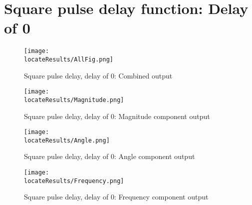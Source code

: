 \newpage
\section{Square pulse delay function: Delay of 0}

\begin{figure}[hb]
    \texttt{[image: \\locateResults/AllFig.png]}    
    \caption{Square pulse delay, delay of 0: Combined output}
    \label{fig:PMUsim-Sqa0-allfig}
\end{figure}


     \begin{figure}
 
    \texttt{[image: \\locateResults/Magnitude.png]}    
         \label{fig:PMUsim-Sqa0Mag}
        \caption{Square pulse delay, delay of 0: Magnitude component output}
 
\end{figure}

     \begin{figure}
 
   \texttt{[image: \\locateResults/Angle.png]}    
         \label{fig:PMUsim-Sqa0Ang}
        \caption{Square pulse delay, delay of 0: Angle component output}
 
\end{figure}

     \begin{figure}
 
   \texttt{[image: \\locateResults/Frequency.png]}    
         \label{fig:PMUsim-Sqa0Freq}
        \caption{Square pulse delay, delay of 0: Frequency component output}
 
\end{figure}


